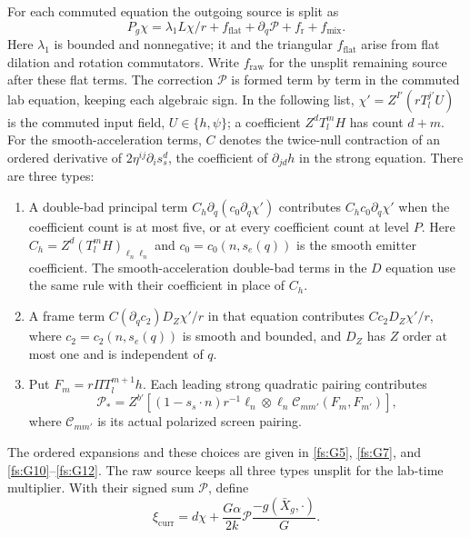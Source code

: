 For each commuted equation the outgoing source is split as
\begin{equation}\label{far:source-split}
 P_g\chi=\lambda_1L\chi/r+f_{\mathrm{flat}}
                       +\partial_q\mathcal P+f_{\mathrm r}+f_{\mathrm{mix}}.
\end{equation}
Here $\lambda_1$ is bounded and nonnegative; it and the triangular
$f_{\mathrm{flat}}$ arise from flat dilation and rotation commutators.
Write $f_{\mathrm{raw}}$ for the unsplit remaining source after these
flat terms.  The correction $\mathcal P$ is formed term by term in the commuted
lab equation, keeping each algebraic sign.  In the following list,
$\chi'=Z^{I'}(rT_l^{j'}U)$ is the commuted input field,
$U\in\{h,\psi\}$; a coefficient $Z^dT_l^mH$ has count $d+m$.
For the smooth-acceleration terms, $C$ denotes the twice-null
contraction of an ordered derivative of $2\eta^{ij}\partial_i s_s^d$,
the coefficient of $\partial_{jd}h$ in the strong equation.
There are three types:
\begin{enumerate}[label=(\roman*)]
\item A double-bad principal term
$C_h\partial_q(c_0\partial_q\chi')$ contributes
$C_hc_0\partial_q\chi'$ when the coefficient count is at most five,
or at every coefficient count at level $P$.
Here $C_h=Z^d(T_l^mH)_{\ell_n\ell_n}$ and
$c_0=c_0(n,s_e(q))$ is the smooth emitter coefficient.
The smooth-acceleration double-bad terms in the $D$ equation use the
same rule with their coefficient in place of $C_h$.
\item A frame term $C(\partial_qc_2)D_Z\chi'/r$ in that equation
contributes $Cc_2D_Z\chi'/r$, where $c_2=c_2(n,s_e(q))$ is smooth
and bounded, and $D_Z$ has $Z$ order at most one and is independent of $q$.
\item Put $F_m=r\Pi T_l^{m+1}h$.  Each leading strong quadratic
pairing contributes
\begin{equation}\label{far:leading-correction}
 \mathcal P_*=Z^{b'}\!\left[(1-s_s\cdot n)r^{-1}\ell_n\otimes\ell_n
                       \mathcal C_{mm'}(F_m,F_{m'})\right],
\end{equation}
where $\mathcal C_{mm'}$ is its actual polarized screen pairing.
\end{enumerate}
The ordered expansions and these choices are given in
\eqref{fs:G5}, \eqref{fs:G7}, and \eqref{fs:G10}--\eqref{fs:G12}.
The raw source keeps all three types unsplit for the lab-time multiplier.
With their signed sum $\mathcal P$, define
\[
 \xi_{\mathrm{curr}}
   =d\chi+\frac{G\alpha}{2k}\mathcal P
                   \frac{-g(\bar X_g,\cdot)}{G}.
\]
